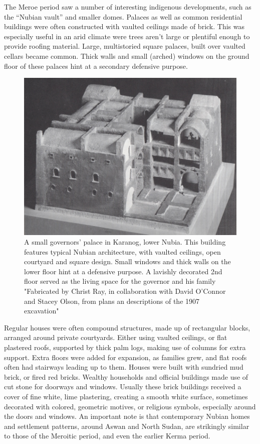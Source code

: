 \documentclass[a4paper,12pt]{scrreprt}
\begin{document}
The Meroe period saw a number of interesting indigenous developments, such as the “Nubian vault” and smaller domes. Palaces as well as common residential buildings were often constructed with vaulted ceilings made of brick. This was especially useful in an arid climate were trees aren’t large or plentiful enough to provide roofing material. Large, multistoried square palaces, built over vaulted cellars became common. Thick walls and small (arched) windows on the ground floor of these palaces hint at a secondary defensive purpose.

\begin{figure}[H]
	\centering
	\includegraphics[width=\textwidth]{img/civic_center/governor_palace_karanog}
	\caption{A small governors' palace in Karanog, lower Nubia. This building features typical Nubian architecture, with vaulted ceilings, open courtyard and square design. Small windows and thick walls on the lower floor hint at a defensive purpose. A lavishly decorated 2nd floor served as the living space for the governor and his family "Fabricated by Christ Ray, in collaboration with David O'Connor and Stacey Olson, from plans an descriptions of the 1907 excavation"}
\end{figure}

Regular houses were often compound structures, made up of rectangular blocks, arranged around private courtyards. Either using vaulted ceilings, or flat plastered roofs, supported by thick palm logs, making use of columns for extra support. Extra floors were added for expansion, as families grew, and flat roofs often had stairways leading up to them. Houses were built with sundried mud brick, or fired red bricks. Wealthy households and official buildings made use of cut stone for doorways and windows. Usually these brick buildings received a cover of fine white, lime plastering, creating a smooth white surface, sometimes decorated with colored, geometric motives, or religious symbols, especially around the doors and windows. An important note is that contemporary Nubian homes and settlement patterns, around Aswan and North Sudan, are strikingly similar to those of the Meroitic period, and even the earlier Kerma period.
\end{document}
